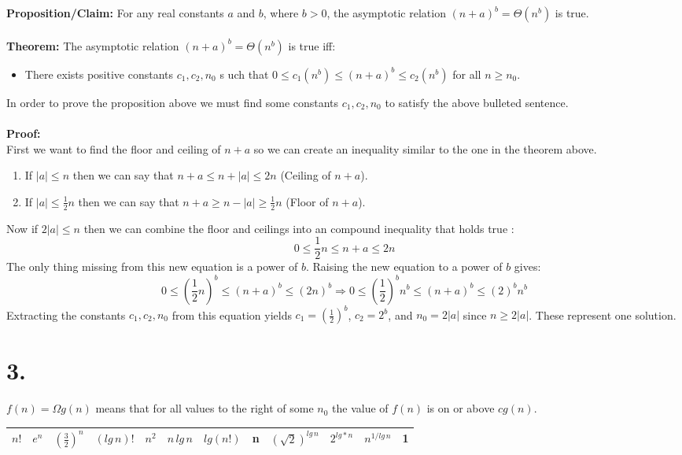 \documentclass[12pt]{article}
\begin{document}
\subsection*{}
\textbf{Proposition/Claim: } For any real constants $a$ and $b$, where $b > 0$, the asymptotic relation $(n+a)^b = \Theta(n^b)$ is true.\\
\\
\textbf{Theorem: }The asymptotic relation $(n+a)^b = \Theta(n^b)$ is true iff:
\begin{itemize}
\item There exists positive constants $c_1, c_2, n_0$ s
uch that $0 \le c_1(n^b) \le (n+a)^b \le c_2(n^b)$ for all $n \ge n_0$.
\end{itemize}In order to prove the proposition above we must find some constants $c_1, c_2, n_0$ to satisfy the above bulleted sentence.\\
\\
\textbf{Proof: }\\
First we want to find the floor and ceiling of $n+a$ so we can create an inequality similar to the one in the theorem above.
\begin{enumerate}
\item If $|a| \le n$ then we can say that $n+a \le n+|a| \le 2n$ (Ceiling of $n+a$).
\item If $|a| \le \frac{1}{2}n$ then we can say that $n+a \ge n-|a| \ge \frac{1}{2}n$ (Floor of $n+a$). 
\end{enumerate}
Now if $2|a| \le n$ then we can combine the floor and ceilings into an compound inequality that holds true :
$$
0 \le \frac{1}{2}n \le n+a \le 2n
$$
The only thing missing from this new equation is a power of $b$.  Raising the new equation to a power of $b$ gives:
$$
0 \le (\frac{1}{2}n)^b \le (n+a)^b \le (2n)^b \Rightarrow 0 \le (\frac{1}{2})^bn^b \le (n+a)^b \le (2)^bn^b
$$  
Extracting the constants $c_1,c_2,n_0$ from this equation yields $c_1 = (\frac{1}{2})^b$, $c_2 = 2^b$, and $n_0 = 2|a|$ since $n \ge 2|a|$.  These represent one solution.
\section*{3.}
$f(n) = \Omega{g(n)}$ means that for all values to the right of some $n_0$ the value of $f(n)$ is on or above $cg(n)$.\\
\begin{center}
\begin{tabular}{|c|c|c|c|c|c|c|c|c|c|c|c|}
\hline
$n!$&$e^n$&$(\frac{3}{2})^n$&$(lg\,n)!$&$n^2$&$n\,lg\,n$&$lg(n!)$&n&$(\sqrt{2})^{lg\,n}$&$2^{lg*n}$&$n^{1/lg\,n}$&1\\
\hline
\end{tabular}
\end{center}
\end{document}
